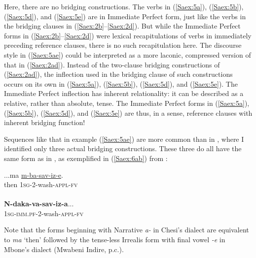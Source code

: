 \documentclass[output=paper]{LSP/langsci}
\begin{document}
Here, there are no bridging constructions. The verbs in (\ref{Saex:5a}), (\ref{Saex:5b}), (\ref{Saex:5d}), and (\ref{Saex:5e}) are in Immediate Perfect form, just like the verbs in the bridging clauses in (\ref{Saex:2b}--\ref{Saex:2d}). But while the Immediate Perfect forms in (\ref{Saex:2b}--\ref{Saex:2d}) were lexical recapitulations of verbs in immediately preceding reference clauses, there is no such recapitulation here. The discourse style in (\ref{Saex:5ae}) could be interpreted as a more laconic, compressed version of that in (\ref{Saex:2ad}). Instead of the two-clause bridging constructions of (\ref{Saex:2ad}), the inflection used in the bridging clause of such constructions occurs on its own in (\ref{Saex:5a}), (\ref{Saex:5b}), (\ref{Saex:5d}), and (\ref{Saex:5e}). The Immediate Perfect inflection has inherent relationality: it can be described as a relative, rather than absolute, tense. The Immediate Perfect forms in (\ref{Saex:5a}), (\ref{Saex:5b}), (\ref{Saex:5d}), and (\ref{Saex:5e}) are thus, in a sense, reference clauses with inherent bridging function!

Sequences like that in example (\ref{Saex:5ae}) are more common than  in \citet{Mbone2014}, where I identified only three actual bridging constructions. These three do all have the same form as in \citet{Chesi2014}, as exemplified in (\ref{Saex:6ab}) from \citet{Mbone2014}:


\begin{exe}
\ex \label{Saex:6ab}
\begin{xlist}
\ex \label{Saex:6a}
\gll ...ma  \underline{m-ba-sav-iz-e}. \\
then  \textsc{1sg}-\textsc{2}-wash-\textsc{appl-fv}\\
\glt {}\\
\ex \label{Saex:6b}
\gll \textbf{N-daka-va-sav-iz-a}...\\     	       
    \textsc{1sg-imm.pf-2}-wash-\textsc{appl-fv}\\
\glt {} 
\end{xlist}
\end{exe}

Note that the forms beginning with Narrative \textit{a-} in Chesi’s dialect are equivalent to \textit{ma} `then' followed by the tense-less Irrealis form with final vowel \textit{-e} in Mbone’s dialect (Mwabeni Indire, p.c.).
%
\end{document}
